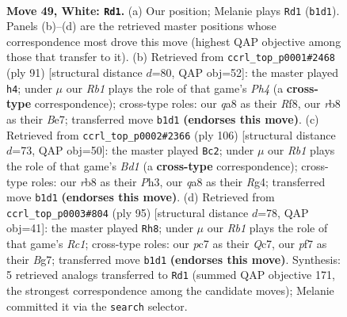 \documentclass[11pt]{article}
\begin{document}
\clearpage

\begin{figure}[p]\centering
\begin{subfigure}{0.46\textwidth}\centering
\resizebox{\linewidth}{!}{%
\newchessgame
\chessboard[
  setfen={qrb3k1/p1p2pp1/1p3n2/7p/1P3P1b/B3Q2P/P1B3P1/1R5K w - - 5 49},
  showmover=false,
  pgfstyle=straightmove, color=movearrow, markmove={b1-d1}
]}
\caption{}
\end{subfigure}\hfill
\begin{subfigure}{0.46\textwidth}\centering
\resizebox{\linewidth}{!}{%
\newchessgame
\chessboard[
  setfen={5rk1/2pbb3/3p3q/3P2pp/2PpN3/3B1P2/3Q2PP/5RK1 b - - 1 46},
  showmover=false,
  pgfstyle=straightmove, color=movearrow, markmove={h5-h4}
]}
\caption{}
\end{subfigure}
\\[4pt]
\begin{subfigure}{0.46\textwidth}\centering
\resizebox{\linewidth}{!}{%
\newchessgame
\chessboard[
  setfen={2r1q1k1/5pp1/pBb1p2p/2P1Pn2/6R1/7P/3Q1PP1/3B2K1 w - - 9 54},
  showmover=false,
  pgfstyle=straightmove, color=movearrow, markmove={d1-c2}
]}
\caption{}
\end{subfigure}\hfill
\begin{subfigure}{0.46\textwidth}\centering
\resizebox{\linewidth}{!}{%
\newchessgame
\chessboard[
  setfen={2r5/2qb1kb1/5pp1/3Pp3/n1p1P3/1p2BR1P/1P4PK/1B1NQ3 b - - 23 48},
  showmover=false,
  pgfstyle=straightmove, color=movearrow, markmove={c8-h8}
]}
\caption{}
\end{subfigure}
\caption{\textbf{Move 49, White: \texttt{Rd1}.} (a) Our position; Melanie plays \texttt{Rd1} (\texttt{b1d1}). Panels (b)--(d) are the retrieved master positions whose correspondence most drove this move (highest QAP objective among those that transfer to it). (b) Retrieved from \texttt{ccrl\_top\_p0001\#2468} (ply 91) [structural distance $d$=80, QAP obj=52]: the master played \texttt{h4}; under $\mu$ our \emph{Rb1} plays the role of that game's \emph{Ph4} (a \textbf{cross-type} correspondence); cross-type roles: our \emph{q}a8 as their \emph{R}f8, our \emph{r}b8 as their \emph{B}e7; transferred move \texttt{b1d1} \textbf{(endorses this move)}. (c) Retrieved from \texttt{ccrl\_top\_p0002\#2366} (ply 106) [structural distance $d$=73, QAP obj=50]: the master played \texttt{Bc2}; under $\mu$ our \emph{Rb1} plays the role of that game's \emph{Bd1} (a \textbf{cross-type} correspondence); cross-type roles: our \emph{r}b8 as their \emph{P}h3, our \emph{q}a8 as their \emph{R}g4; transferred move \texttt{b1d1} \textbf{(endorses this move)}. (d) Retrieved from \texttt{ccrl\_top\_p0003\#804} (ply 95) [structural distance $d$=78, QAP obj=41]: the master played \texttt{Rh8}; under $\mu$ our \emph{Rb1} plays the role of that game's \emph{Rc1}; cross-type roles: our \emph{p}c7 as their \emph{Q}c7, our \emph{p}f7 as their \emph{B}g7; transferred move \texttt{b1d1} \textbf{(endorses this move)}. Synthesis: 5 retrieved analogs transferred to \texttt{Rd1} (summed QAP objective 171, the strongest correspondence among the candidate moves); Melanie committed it via the \texttt{search} selector.}
\label{fig:thought-m96}
\end{figure}
\end{document}
